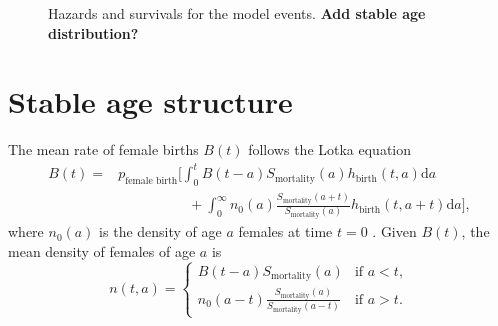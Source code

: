 \documentclass[12pt]{article}
\newcommand{\md}{\mathrm{d}}
\begin{document}
\begin{figure}
  \centering
  
  \caption{Hazards and survivals for the model events.
    \textbf{Add stable age distribution?}}
  \label{fig:distributions}
\end{figure}


\section{Stable age structure}
\label{stable_age_structure}

The mean rate of female births $B(t)$
follows the Lotka equation
\begin{equation}
  \label{lotka}
  \begin{split}
    B(t) =&
    p_{\text{female birth}} \bigg[
      \int_0^t B(t - a)
      S_{\text{mortality}}(a)
      h_{\text{birth}}(t, a) \md a
    \\
    & \quad\quad\quad\quad\quad {} +
      \int_0^{\infty} n_0(a)
      \frac{S_{\text{mortality}}(a + t)}{S_{\text{mortality}}(a)}
      h_{\text{birth}}(t, a + t) \md a
    \bigg],
  \end{split}
\end{equation}
where $n_0(a)$ is the density of age $a$ females at time $t = 0$
\citetext{\citealp[Chapter VI, Section 29 on
  pp.~159--161]{harris_1963};
  \citealp[Chapter 20 on pp.~353--364]{kot_01}}.
Given $B(t)$, the mean density of females of age $a$ is
\begin{equation}
  n(t, a) =
  \begin{cases}
    B(t - a) S_{\text{mortality}}(a)
    & \text{if $a < t$},
    \\
    n_0(a - t)
    \frac{S_{\text{mortality}}(a)}{S_{\text{mortality}}(a - t)}
    & \text{if $a > t$}.
  \end{cases}
\end{equation}
\end{document}
